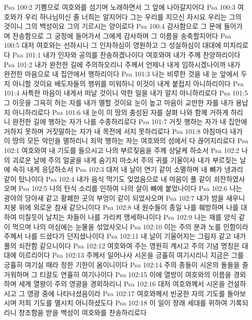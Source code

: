 Psa 100:2  기쁨으로 여호와를 섬기며 노래하면서 그 앞에 나아갈지어다
Psa 100:3  여호와가 우리 하나님이신 줄 너희는 알지어다 그는 우리를 지으신 자시요 우리는 그의 것이니 그의 백성이요 그의 기르시는 양이로다
Psa 100:4  감사함으로 그 문에 들어가며 찬송함으로 그 궁정에 들어가서 그에게 감사하며 그 이름을 송축할지어다
Psa 100:5  대저 여호와는 선하시니 그 인자하심이 영원하고 그 성실하심이 대대에 미치리로다
Psa 101:1  내가 인자와 공의를 찬송하겠나이다 여호와여 내가 주께 찬양하리이다
Psa 101:2  내가 완전한 길에 주의하오리니 주께서 언제나 내게 임하시겠나이까 내가 완전한 마음으로 내 집안에서 행하리이다
Psa 101:3  나는 비루한 것을 내 눈 앞에서 두지 아니할 것이요 배도자들의 행위를 미워하니 이것이 내게 붙접지 아니하리이다
Psa 101:4  사특한 마음이 내게서 떠날 것이니 악한 일을 내가 알지 아니하리로다
Psa 101:5  그 이웃을 그윽히 허는 자를 내가 멸할 것이요 눈이 높고 마음이 교만한 자를 내가 용납지 아니하리로다
Psa 101:6  내 눈이 이 땅의 충성된 자를 살펴 나와 함께 거하게 하리니 완전한 길에 행하는 자가 나를 수종하리로다
Psa 101:7  거짓 행하는 자가 내 집안에 거하지 못하며 거짓말하는 자가 내 목전에 서지 못하리로다
Psa 101:8  아침마다 내가 이 땅의 모든 악인을 멸하리니 죄악 행하는 자는 여호와의 성에서 다 끊어지리로다
Psa 102:1  여호와여 내 기도를 들으시고 나의 부르짖음을 주께 상달케 하소서
Psa 102:2  나의 괴로운 날에 주의 얼굴을 내게 숨기지 마소서 주의 귀를 기울이사 내가 부르짖는 날에 속히 내게 응답하소서
Psa 102:3  대저 내 날이 연기 같이 소멸하며 내 뼈가 냉과리 같이 탔나이다
Psa 102:4  내가 음식 먹기도 잊었음으로 내 마음이 풀 같이 쇠잔하였사오며
Psa 102:5  나의 탄식 소리를 인하여 나의 살이 뼈에 붙었나이다
Psa 102:6  나는 광야의 당아새 같고 황폐한 곳의 부엉이 같이 되었사오며
Psa 102:7  내가 밤을 새우니 지붕 위에 외로운 참새 같으니이다
Psa 102:8  내 원수들이 종일 나를 훼방하며 나를 대하여 미칠듯이 날치는 자들이 나를 가리켜 맹세하나이다
Psa 102:9  나는 재를 양식 같이 먹으며 나의 마심에는 눈물을 섞었사오니
Psa 102:10  이는 주의 분과 노를 인함이라 주께서 나를 드셨다가 던지셨나이다
Psa 102:11  내 날이 기울어지는 그림자 같고 내가 풀의 쇠잔함 같으니이다
Psa 102:12  여호와여 주는 영원히 계시고 주의 기념 명칭은 대대에 이르리이다
Psa 102:13  주께서 일어나사 시온을 긍휼히 여기시리니 지금은 그를 긍휼히 여기실 때라 정한 기한이 옴이니이다
Psa 102:14  주의 종들이 시온의 돌들을 즐거워하며 그 티끌도 연휼히 여기나이다
Psa 102:15  이에 열방이 여호와의 이름을 경외하며 세계 열왕이 주의 영광을 경외하리니
Psa 102:16  대저 여호와께서 시온을 건설하시고 그 영광 중에 나타나셨음이라
Psa 102:17  여호와께서 빈궁한 자의 기도를 돌아보시며 저희 기도를 멸시치 아니하셨도다
Psa 102:18  이 일이 장래 세대를 위하여 기록되리니 창조함을 받을 백성이 여호와를 찬송하리로다
